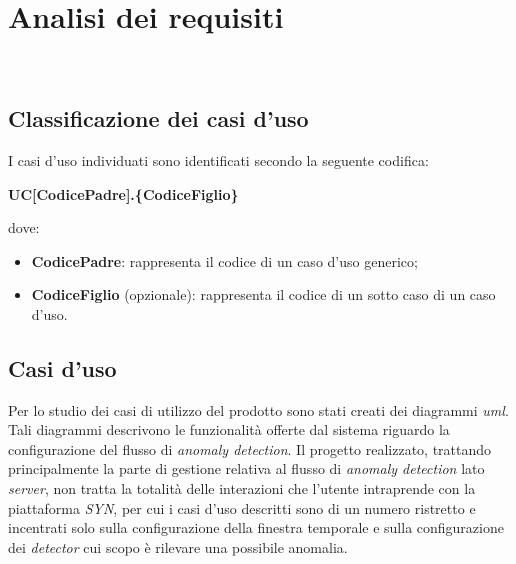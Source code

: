 
\chapter{Analisi dei requisiti}
\label{cap:analisi-requisiti}

\\


\section{Classificazione dei casi d'uso}
I casi d'uso individuati sono identificati secondo la seguente codifica:
\begin{center}
\textbf{UC[CodicePadre].\{CodiceFiglio\}}\\
\end{center}
dove:


\begin{itemize}
\item \textbf{CodicePadre}: rappresenta il codice di un caso d'uso generico;
\item \textbf{CodiceFiglio} (opzionale): rappresenta il codice di un sotto caso di un caso d'uso.
\end{itemize}


\section{Casi d'uso}
Per lo studio dei casi di utilizzo del prodotto sono stati creati dei diagrammi \textit{\gls{uml}}. Tali diagrammi descrivono le funzionalità offerte dal sistema riguardo la configurazione del flusso di \textit{anomaly detection}. Il progetto realizzato, trattando principalmente la parte di gestione relativa al flusso di \textit{anomaly detection} lato \textit{server}, non tratta la totalità delle interazioni che l'utente intraprende con la piattaforma \textit{SYN}, per cui i casi d'uso descritti sono di un numero ristretto e incentrati solo sulla configurazione della finestra temporale e sulla configurazione dei \textit{detector} cui scopo è rilevare una possibile anomalia.

